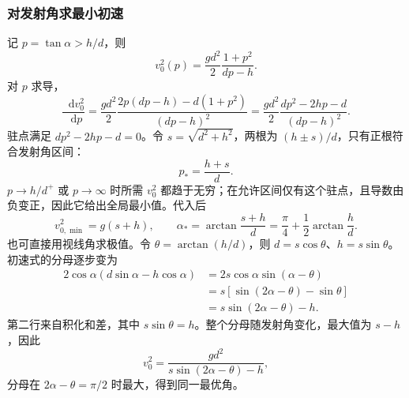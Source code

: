 \documentclass[UTF8,fontset=fandol,a4paper,11pt]{ctexart}
\newcommand{\dd}{\mathop{}\!\mathrm{d}}
\begin{document}
\subsubsection*{对发射角求最小初速}
记 $p=\tan\alpha>h/d$，则
\[
v_0^2(p)=\frac{gd^2}{2}\frac{1+p^2}{dp-h}.
\]
对 $p$ 求导，
\[
\frac{\dd v_0^2}{\dd p}
=\frac{gd^2}{2}\frac{2p(dp-h)-d(1+p^2)}{(dp-h)^2}
=\frac{gd^2}{2}\frac{dp^2-2hp-d}{(dp-h)^2}.
\]
驻点满足 $dp^2-2hp-d=0$。令 $s=\sqrt{d^2+h^2}$，两根为 $(h\pm s)/d$，只有正根符合发射角区间：
\[
p_* =\frac{h+s}{d}.
\]
$p\to h/d^+$ 或 $p\to\infty$ 时所需 $v_0^2$ 都趋于无穷；在允许区间仅有这个驻点，且导数由负变正，因此它给出全局最小值。代入后
\[
\boxed{v_{0,\min}^2=g(s+h)},\qquad
\boxed{\alpha_* =\arctan\frac{s+h}{d}
=\frac\pi4+\frac12\arctan\frac hd}.
\]
也可直接用视线角求极值。令 $\theta=\arctan(h/d)$，则 $d=s\cos\theta$、$h=s\sin\theta$。初速式的分母逐步变为
\[
\begin{aligned}
2\cos\alpha(d\sin\alpha-h\cos\alpha)
&=2s\cos\alpha\sin(\alpha-\theta)\\
&=s[\sin(2\alpha-\theta)-\sin\theta]\\
&=s\sin(2\alpha-\theta)-h.
\end{aligned}
\]
第二行来自积化和差，其中 $s\sin\theta=h$。整个分母随发射角变化，最大值为 $s-h$，因此
\[
v_0^2=\frac{gd^2}{s\sin(2\alpha-\theta)-h},
\]
分母在 $2\alpha-\theta=\pi/2$ 时最大，得到同一最优角。
\Needspace{0.46\textheight}
\end{document}
